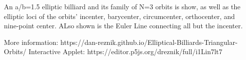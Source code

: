 An a/b=1.5 elliptic billiard and its family of N=3 orbits is show, as well as the elliptic loci of the orbits' incenter, barycenter, circumcenter, orthocenter, and nine-point center. ALso shown is the Euler Line connecting all but the incenter.

More information: https://dan-reznik.github.io/Elliptical-Billiards-Triangular-Orbits/
Interactive Applet: https://editor.p5js.org/dreznik/full/i1Lin7lt7